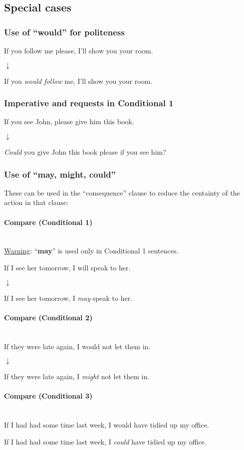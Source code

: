 \documentclass{article}
\newcommand{\wrn}{\underline{Warning}: }
\newcommand{\pph}[1]{\paragraph{#1} \phantom{}\\}
\begin{document}
\newpage
\subsection{Special cases}
\subsubsection{Use of ``would'' for politeness}
If you follow me please, I'll show you your room.

\hspace*{3.6cm}$\downarrow$

If you \textit{would follow} me, I'll show you your room.

\subsubsection{Imperative and requests in Conditional 1}
If you see John, please give him this book.

\hspace*{3.6cm}$\downarrow$

\textit{Could} you give John this book please if you see him?

\subsubsection{Use of ``may, might, could''}
These can be used in the ``consequence'' clause to reduce the centainty
of the action in that clause:

\pph{Compare (Conditional 1)}
\wrn{``\textbf{may}'' is used only in Conditional 1 sentences.}

If I see her tomorrow, I will speak to her.

\hspace*{3cm}$\downarrow$

If I see her tomorrow, I \textit{may} speak to her.

\pph{Compare (Conditional 2)}
If they were late again, I would not let them in.

\hspace*{3.5cm}$\downarrow$

If they were late again, I \textit{might} not let them in.

\pph{Compare (Conditional 3)}
If I had had some time last week, I would have tidied up my office.



If I had had some time last week, I \textit{could} have tidied up my office.
\end{document}
